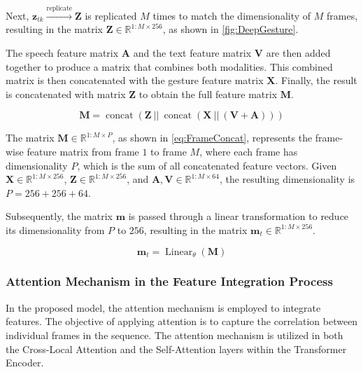 Next, $\mathbf{z}_{tk} \xrightarrow{\operatorname{replicate}} \mathbf{Z}$ is replicated $M$ times to match the dimensionality of $M$ frames, resulting in the matrix $\mathbf{Z} \in \mathbb{R}^{1:M \times 256}$, as shown in \autoref{fig:DeepGesture}.

The speech feature matrix $\mathbf{A}$ and the text feature matrix $\mathbf{V}$ are then added together to produce a matrix that combines both modalities. This combined matrix is then concatenated with the gesture feature matrix $\mathbf{X}$. Finally, the result is concatenated with matrix $\mathbf{Z}$ to obtain the full feature matrix $\mathbf{M}$.


\begin{equation}
	\label{eq:FrameConcat}
	\mathbf{M} = \operatorname{concat}( \mathbf{Z}\  || \   \operatorname{concat}(\mathbf{X}\ || \  (\mathbf{V} + \mathbf{A}) ) )
\end{equation}

The matrix $\mathbf{M} \in \mathbb{R}^{1:M \times P}$, as shown in \autoref{eq:FrameConcat}, represents the frame-wise feature matrix from frame $1$ to frame $M$, where each frame has dimensionality $P$, which is the sum of all concatenated feature vectors. Given $\mathbf{X} \in \mathbb{R}^{1:M \times 256}$, $\mathbf{Z} \in \mathbb{R}^{1:M \times 256}$, and $\mathbf{A}, \mathbf{V} \in \mathbb{R}^{1:M \times 64}$, the resulting dimensionality is $P = 256 + 256 + 64$.

Subsequently, the matrix $\mathbf{m}$ is passed through a linear transformation to reduce its dimensionality from $P$ to $256$, resulting in the matrix $\mathbf{m}_{t} \in \mathbb{R}^{1:M \times 256}$.

\begin{equation}
	\label{eq:FeatureDimensionReducion}
	\mathbf{m}_{t} = \operatorname{Linear}_{\theta}( \mathbf{M} )
\end{equation}

\subsubsection{Attention Mechanism in the Feature Integration Process}

In the proposed model, the attention mechanism \cite{vaswani2017attention} is employed to integrate features. The objective of applying attention is to capture the correlation between individual frames in the sequence. The attention mechanism is utilized in both the Cross-Local Attention and the Self-Attention layers within the Transformer Encoder.


